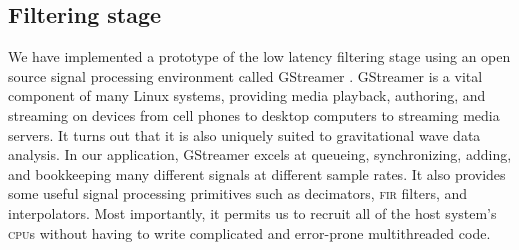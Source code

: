 \subsection{Filtering stage}

We have implemented a prototype of the low latency filtering stage using an
open source signal processing environment called GStreamer \cite{gstreamer}.
GStreamer is a vital component of many Linux systems, providing media playback,
authoring, and streaming on devices from cell phones to desktop computers to
streaming media servers.  It turns out that it is also uniquely suited to
gravitational wave data analysis.  In our application, GStreamer excels at
queueing, synchronizing, adding, and bookkeeping many different signals at
different sample rates.  It also provides some useful signal processing
primitives such as decimators, \textsc{fir} filters, and interpolators.  Most
importantly, it permits us to recruit all of the host system's \textsc{cpu}s
without having to write complicated and error-prone multithreaded code.

